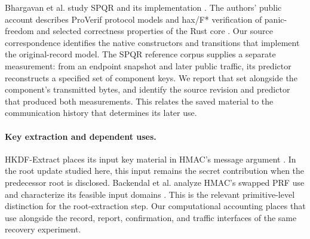 Bhargavan et al. study SPQR and its implementation \cite{spqr2026}. The authors'
public account describes ProVerif protocol models and hax/F* verification of
panic-freedom and selected correctness properties of the Rust core
\cite{spqrverification2025}.
Our source correspondence identifies the native constructors and
transitions that implement the original-record model. The SPQR reference
corpus supplies a separate measurement: from an endpoint snapshot and
later public traffic, its predictor reconstructs a specified set of
component keys. We report that set alongside the component's transmitted
bytes, and identify the source revision and predictor that produced both
measurements. This relates the saved material to the communication history
that determines its later use.

\paragraph{Key extraction and dependent uses.}
HKDF-Extract places its input key material in HMAC's message argument
\cite{rfc5869}. In the root update studied here, this input remains the secret
contribution when the predecessor root is disclosed. Backendal et al. analyze
HMAC's swapped PRF use and characterize its feasible input domains
\cite{hmacswap2023}. This is the relevant primitive-level distinction for the
root-extraction step. Our computational accounting places that use alongside
the record, report, confirmation, and traffic interfaces of the same recovery
experiment.
